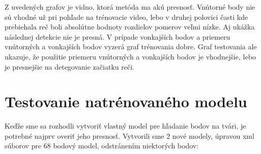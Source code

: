 Z uvedených grafov je vidno, ktorá metóda ma akú presnosť. 
Vnútorné body nie sú vhodné už pri pohľade na trénovacie video, lebo v druhej polovici časti kde prebiehala reč boli absolútne hodnoty rozdielov pomerov veľmi nízke.
Aj ukážka následnej detekcie nie je presná.
V prípade vonkajších bodov a priemeru vnútorných a vonkajších bodov vyzerá graf trénovania dobre.
Graf testovania ale ukazuje, že použitie priemeru vnútorných a vonkajších bodov je vhodnejšie, lebo je presnejšie na detegovanie začiatku reči. 

\section{Testovanie natrénovaného modelu}\label{testovanieModelu}
Keďže sme sa rozhodli vytvoriť vlastný model pre hľadanie bodov na tvári, je potrebné najprv overiť jeho presnosť.
Vytvorili sme 2 nové modely, úpravou xml súborov pre 68 bodový model, odstránením niektorých bodov:
